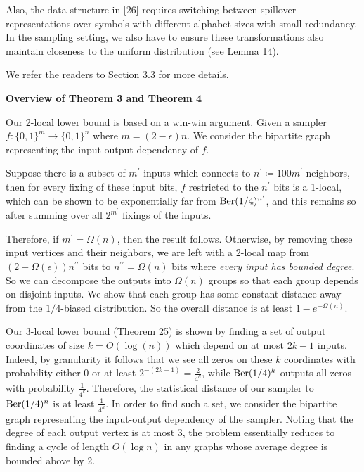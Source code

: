 \documentclass[10pt,a4paper]{article}
\begin{document}
Also, the data structure in [26] requires switching between spillover representations over symbols with different alphabet sizes with small redundancy. In the sampling setting, we also have to ensure these transformations also maintain closeness to the uniform distribution (see Lemma 14).\par




We refer the readers to Section 3.3 for more details.\par






\par\medskip\noindent\textbf{Overview of Theorem 3 and Theorem 4
}\par




Our 2-local lower bound is based on a win-win argument.
Given a sampler $f\colon\{0,1\}^{m}\to\{0,1\}^{n}$ where $m=(2-\epsilon)n$.
We consider the bipartite graph representing the input-output dependency of $f$.\par




Suppose there is a subset of $m^{\prime}$ inputs which connects to $n^{\prime}\coloneq 100m^{\prime}$ neighbors, then for every fixing of these input bits, $f$ restricted to the $n^{\prime}$ bits is a 1-local, which can be shown to be exponentially far from $\textnormal{Ber}(1/4)^{n^{\prime}}$, and this remains so after summing over all $2^{m^{\prime}}$ fixings of the inputs.\par




Therefore, if $m^{\prime}=\Omega(n)$, then the result follows.
Otherwise, by removing these input vertices and their neighbors, we are left with a $2$-local map from $(2-\Omega(\epsilon))n^{\prime\prime}$ bits to $n^{\prime\prime}=\Omega(n)$ bits where \emph{every input has bounded degree}.
So we can decompose the outputs into $\Omega(n)$ groups so that each group depends on disjoint inputs.
We show that each group has some constant distance away from the $1/4$-biased distribution.
So the overall distance is at least $1-e^{-\Omega(n)}$.\par




Our 3-local lower bound (Theorem 25) is shown by finding a set of output coordinates of size $k=O(\log(n))$ which depend on at most $2k-1$ inputs. Indeed, by granularity it follows that we see all zeros on these $k$ coordinates with probability either 0 or at least $2^{-(2k-1)}=\frac{2}{4^{k}}$, while $\textnormal{Ber}(1/4)^{k}$ outputs all zeros with probability $\frac{1}{4^{k}}$. Therefore, the statistical distance of our sampler to $\textnormal{Ber}(1/4)^{n}$ is at least $\frac{1}{4^{k}}$. In order to find such a set, we consider the bipartite graph representing the input-output dependency of the sampler. Noting that the degree of each output vertex is at most 3, the problem essentially reduces to finding a cycle of length $O(\log n)$ in any graphs whose average degree is bounded above by 2.\par
\end{document}

